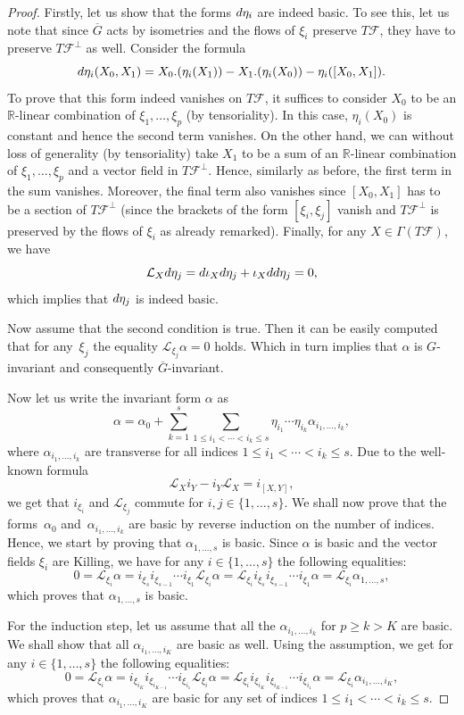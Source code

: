 \documentclass[10pt,a4paper]{amsart}
\begin{document}
\begin{proof}
Firstly, let us show that the forms ${\rm d}\eta_i$ are indeed basic. To see this, let us note that since $\overline{G}$ acts by isometries and the flows of $\xi_i$ preserve $T\mathcal{F}$, they have to preserve $T\mathcal{F}^{\perp}$ as well. Consider the formula
\[{\rm d}\eta_i(X_0,X_1)= X_0.(\eta_i(X_1))-X_1.(\eta_i(X_0)) -\eta_i([X_0,X_1]).\]
To prove that this form indeed vanishes on $T\mathcal{F}$, it suffices to consider $X_0$ to be an $\mathbb{R}$-linear combination of $\xi_1,\dots,\xi_p$ (by tensoriality). In this case, $\eta_i(X_0)$ is constant and hence the second term vanishes. On the other hand, we can without loss of generality (by tensoriality) take $X_1$ to be a sum of an $\mathbb{R}$-linear combination of $\xi_1,\dots,\xi_p$ and a vector field in $T\mathcal{F}^{\perp}$. Hence, similarly as before, the first term in the sum vanishes. Moreover, the final term also vanishes since $[X_0,X_1]$ has to be a section of $T\mathcal{F}^{\perp}$ (since the brackets of the form $[\xi_i,\xi_j]$ vanish and $T\mathcal{F}^{\perp}$ is preserved by the flows of $\xi_i$ as already remarked). Finally, for any $X\in\Gamma(T\mathcal{F})$, we have{\samepage
\[\mathcal{L}_X{\rm d}\eta_j={\rm d}\iota_X{\rm d}\eta_j+\iota_X{\rm d}{\rm d}\eta_j=0,\]
which implies that ${\rm d}\eta_j$ is indeed basic.}

Now assume that the second condition is true. Then it can be easily computed that for any~$\xi_j$ the equality $\mathcal{L}_{\xi_j}\alpha=0$ holds. Which in turn implies that $\alpha$ is $G$-invariant and consequently $\overline{G}$-invariant.

Now let us write the invariant form $\alpha$ as
\[\alpha=\alpha_0+\sum\limits_{k=1}^s\sum\limits_{1\leq i_1<\cdots <i_k\leq s}\eta_{i_1}\cdots \eta_{i_k}\alpha_{i_1,\dots,i_k},\]
where $\alpha_{i_1,\dots,i_k}$ are transverse for all indices $1\leq i_1<\cdots <i_k\leq s$. Due to the well-known formula
\[\mathcal{L}_{X}i_{Y}-i_{Y}\mathcal{L}_{X}=i_{[X,Y]},\]
we get that $i_{\xi_i}$ and $\mathcal{L}_{\xi_j}$ commute for $i,j\in\{1,\dots,s\}$. We shall now prove that the forms~$\alpha_0$ and~${\alpha_{i_1,\dots,i_k}}$ are basic by reverse induction on the number of indices. Hence, we start by proving that $\alpha_{1,\dots,s}$ is basic. Since $\alpha$ is basic and the vector fields $\xi_i$ are Killing, we have for any ${i\in\{1,\dots,s\}}$ the following equalities:
\[0=\mathcal{L}_{\xi_i}\alpha=i_{\xi_s}i_{\xi_{s-1}}\cdots i_{\xi_1}\mathcal{L}_{\xi_i}\alpha=\mathcal{L}_{\xi_i}i_{\xi_{s}}i_{\xi_{s-1}}\cdots i_{\xi_1}\alpha=\mathcal{L}_{\xi_i}\alpha_{1,\dots,s},\]
which proves that $\alpha_{1,\dots,s}$ is basic.

For the induction step, let us assume that all the $\alpha_{i_1,\dots,i_{k}}$ for $p\geq k>K$ are basic. We shall show that all $\alpha_{i_1,\dots,i_{K}}$ are basic as well. Using the assumption, we get for any $i\in\{1,\dots,s\}$ the following equalities:
\[0=\mathcal{L}_{\xi_i}\alpha=i_{\xi_{i_K}}i_{\xi_{i_{K-1}}}\cdots i_{\xi_{i_1}}\mathcal{L}_{\xi_i}\alpha=\mathcal{L}_{\xi_i}i_{\xi_{i_K}}i_{\xi_{i_{K-1}}}\cdots i_{\xi_{i_1}}\alpha=\mathcal{L}_{\xi_i}\alpha_{i_1,\dots,i_K},\]
which proves that $\alpha_{i_1,\dots,i_K}$ are basic for any set of indices $1\leq i_1<\cdots <i_k\leq s$.
\end{proof}
\end{document}
